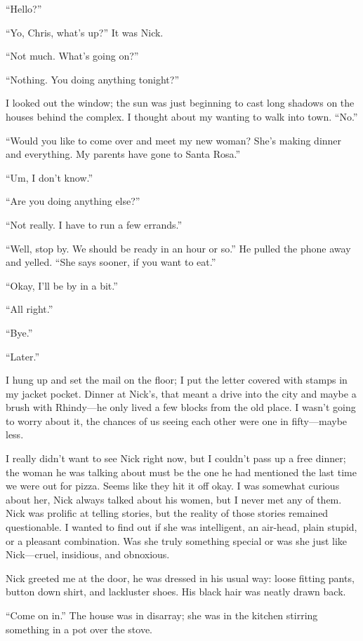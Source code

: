 ``Hello?''

``Yo, Chris, what's up?'' It was Nick.

``Not much. What's going on?''

``Nothing. You doing anything tonight?''

I looked out the window; the sun was just beginning to cast long shadows
on the houses behind the complex. I thought about my wanting to walk
into town. ``No.''

``Would you like to come over and meet my new woman? She's making dinner
and everything. My parents have gone to Santa Rosa.''

``Um, I don't know.''

``Are you doing anything else?''

``Not really. I have to run a few errands.''

``Well, stop by. We should be ready in an hour or so.'' He pulled the
phone away and yelled. ``She says sooner, if you want to eat.''

``Okay, I'll be by in a bit.''

``All right.''

``Bye.''

``Later.''

I hung up and set the mail on the floor; I put the letter covered with
stamps in my jacket pocket. Dinner at Nick's, that meant a drive into
the city and maybe a brush with Rhindy---he only lived a few blocks from
the old place. I wasn't going to worry about it, the chances of us
seeing each other were one in fifty---maybe less.

I really didn't want to see Nick right now, but I couldn't pass up a
free dinner; the woman he was talking about must be the one he had
mentioned the last time we were out for pizza. Seems like they hit it
off okay. I was somewhat curious about her, Nick always talked about his
women, but I never met any of them. Nick was prolific at telling
stories, but the reality of those stories remained questionable. I
wanted to find out if she was intelligent, an air-head, plain stupid, or
a pleasant combination. Was she truly something special or was she just
like Nick---cruel, insidious, and obnoxious.

Nick greeted me at the door, he was dressed in his usual way: loose
fitting pants, button down shirt, and lackluster shoes. His black hair
was neatly drawn back.

``Come on in.'' The house was in disarray; she was in the kitchen
stirring something in a pot over the stove.

